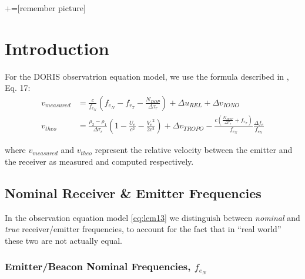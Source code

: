 +=[remember picture]
\everymath{\displaystyle}

\section{Introduction}
\label{sec:doris-introduction}

For the DORIS observatrion equation model, we use the formula described in 
\cite{lemoine-2016}, Eq. 17:
\begin{subequations} \label{eq:lem13}
    \begin{align}
        v_{measured} & = \frac{c}{f_{e_N}} (f_{e_N} - f_{r_T} -
          \frac{N_{DOP}}{\Delta\tau_r}) + \Delta u_{REL} + 
          \Delta v_{IONO} \label{eq:lem13a} \\
        v_{theo} &= \frac{\rho_2 - \rho_1}{\Delta\tau_r} 
          (1- \frac{U_e}{c^2} - \frac{{V_e}^2}{2 c^2}) + 
          \Delta v_{TROPO} - \frac{c(\frac{N_{DOP}}{\Delta\tau_r} + 
          f_{r_T})}{f_{e_N}} \frac{\Delta f_e}{f_{e_N}} \label{eq:lem13b}
    \end{align}
\end{subequations}

where $v_{measured}$ and $v_{theo}$ represent the relative velocity between  
the emitter and the receiver as measured and computed respectively.

\subsection{Nominal Receiver \& Emitter Frequencies}
\label{ssec:nominal-frequencies}
In the observation equation model \ref{eq:lem13} we distinguish between 
\emph{nominal} and \emph{true} receiver/emitter frequencies, to account for 
the fact that in ``real world'' these two are not actually equal.

\subsubsection{Emitter/Beacon Nominal Frequencies, $f_{e_N}$}
\label{sssec:beacon-nominal-frequencies}


